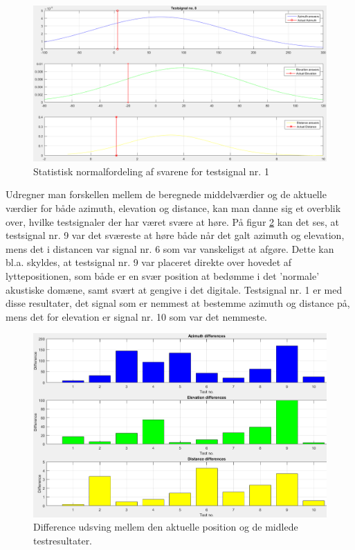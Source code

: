 \begin{figure}[h]
	\centering
	\includegraphics[width=1.1\linewidth]{All_Pics/test8stat}
	\caption{Statistisk normalfordeling af svarene for testsignal nr. 1}
	\label{fig:test8stat}
\end{figure}

Udregner man forskellen mellem de beregnede middelværdier og de aktuelle værdier for både azimuth, elevation og distance, kan man danne sig et overblik over, hvilke testsignaler der har været svære at høre. På figur \ref{fig:resoverblikdiff} kan det ses, at testsignal nr. 9 var det sværeste at høre både når det galt azimuth og elevation, mens det i distancen var signal nr. 6 som var vanskeligst at afgøre. Dette kan bl.a. skyldes, at testsignal nr. 9 var placeret direkte over hovedet af lyttepositionen, som både er en svær position at bedømme i det 'normale' akustiske domæne, samt svært at gengive i det digitale. 
Testsignal nr. 1 er med disse resultater, det signal som er nemmest at bestemme azimuth og distance på, mens det for elevation er signal nr. 10 som var det nemmeste.


\begin{figure}[h]
	\centering
	\includegraphics[width=1\linewidth]{All_Pics/resoverblikdiff}
	\caption{Difference udsving mellem den aktuelle position og de midlede testresultater.}
	\label{fig:resoverblikdiff}
\end{figure}






